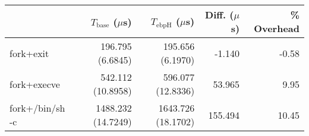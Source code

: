 \begin{tabular}{>{\ttfamily}lrrrr}
\toprule
\multicolumn{1}{l}{Program} & $T_\text{base}$ ($\mu$s) & $T_\text{ebpH}$ ($\mu$s) & Diff. ($\mu$s) & \% Overhead \\
\midrule
                  fork+exit &         196.795 (6.6845) &         195.656 (6.1970) &         -1.140 &       -0.58 \\
                fork+execve &        542.112 (10.8958) &        596.077 (12.8336) &         53.965 &        9.95 \\
            fork+/bin/sh -c &       1488.232 (14.7249) &       1643.726 (18.1702) &        155.494 &       10.45 \\
\bottomrule
\end{tabular}
